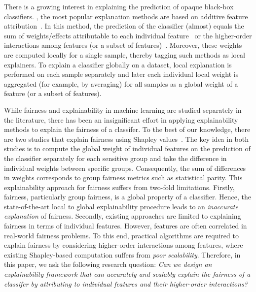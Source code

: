There is a growing interest in explaining the prediction of opaque black-box classifiers. , the most popular explanation methods are based on additive feature attribution~\cite{lundberg2017unified,ribeiro2016should}. In this method, the prediction of the classifier (almost) equals the sum of weights/effects attributable to each individual feature~\cite{lundberg2017unified} or the higher-order interactions among features (or a subset of features)~\cite{sundararajan2020shapley}. Moreover, these weights are computed locally for a single sample, thereby tagging such methods as local explainers. To explain a classifier globally on a dataset, local explanation is performed on each sample separately and later each individual local weight is aggregated (for example, by averaging) for all samples as a global weight of a feature (or a subset of features). 

While fairness and explainability in machine learning are studied separately in the literature, there has been an insignificant effort in applying explainability methods to explain the fairness of a classifer. To the best of our knowledge, there are two studies that explain fairness using Shapley values~\cite{lundberg2020explaining,benesse2021fairness}. The key idea in both studies is to compute the global weight of individual features on the prediction of the classifier separately for each sensitive group and take the difference in individual weights between specific groups. Consequently, the sum of differences in weights corresponds to group fairness metrics such as statistical parity. This explainability approach for fairness suffers from two-fold limitations. Firstly, fairness, particularly group fairness, is a global property of a classifier. Hence, the state-of-the-art local to global explainability procedure leads to an \emph{inaccurate explanation} of fairness. Secondly, existing approaches are limited to explaining fairness in terms of individual features. However, features are often correlated in real-world fairness problems. To this end, practical algorithms are required to explain fairness by considering higher-order interactions among features, where existing Shapley-based computation suffers from \emph{poor scalability}. Therefore, in this paper, we ask the following research question: \emph{Can we design an explainability framework that can accurately and scalably explain the fairness of a classifer by attributing to individual features and their higher-order interactions?}

